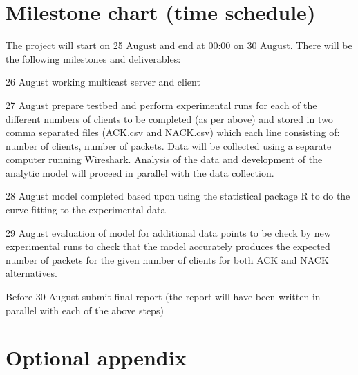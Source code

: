 \documentclass[12pt,twoside,english]{article}
\begin{document}
\section{Milestone chart (time schedule)}
\label{sect:milestones}

The project will start on 25 August and end at 00:00 on 30 August. There will be the following milestones and deliverables:

\begin{description}
\item{26 August} working multicast server and client

\item{27 August} prepare testbed and perform experimental runs for each of the
  different numbers of clients to be completed (as per above) and stored in
  two comma separated files (ACK.csv and NACK.csv) which each line consisting
  of: number of clients, number of packets. Data will be collected using a
  separate computer running Wireshark. Analysis of the data and development of
  the analytic model will proceed in parallel with the data collection.

\item{28 August} model completed based upon using the statistical package R to do the curve fitting to the experimental data

\item{29 August} evaluation of model for additional data points to be check by new experimental runs to check that the model accurately produces the expected number of packets for the given number of clients for both \gls{ACK} and \gls{NACK} alternatives.

\item{Before 30 August} submit final report (the report will have been written in parallel with each of the above steps)
\end{description}




\appendix
\section{Optional appendix}
\end{document}
